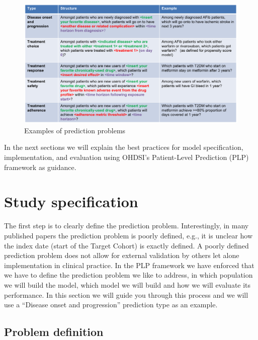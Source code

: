 \documentclass[]{book}
\begin{document}
\begin{figure}
\centering
\includegraphics{images/PatientLevelPrediction/problems.png}
\caption{\label{fig:problems}Examples of prediction problems}
\end{figure}

In the next sections we will explain the best practices for model
specification, implementation, and evaluation using OHDSI's
Patient-Level Prediction (PLP) framework as guidance.

\section{Study specification}\label{study-specification}

The first step is to clearly define the prediction problem.
Interestingly, in many published papers the prediction problem is poorly
defined, e.g., it is unclear how the index date (start of the Target
Cohort) is exactly defined. A poorly defined prediction problem does not
allow for external validation by others let alone implementation in
clinical practice. In the PLP framework we have enforced that we have to
define the prediction problem we like to address, in which population we
will build the model, which model we will build and how we will evaluate
its performance. In this section we will guide you through this process
and we will use a ``Disease onset and progression'' prediction type as
an example.

\subsection{Problem definition}\label{problem-definition}
\end{document}
